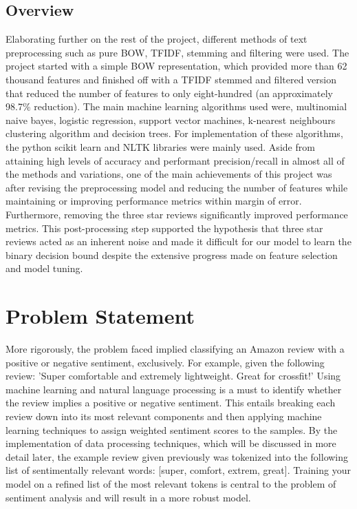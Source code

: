 \documentclass[conference]{IEEEtran}
\begin{document}
\subsection{Overview}
Elaborating further on the rest of the project, different methods of text preprocessing such as pure BOW, TFIDF, stemming and filtering were used. The project started with a simple BOW representation, which provided more than 62 thousand features and finished off with a TFIDF stemmed and filtered version that reduced the number of features to only eight-hundred (an approximately 98.7\% reduction). The main machine learning algorithms used were, multinomial naive bayes, logistic regression, support vector machines, k-nearest neighbours clustering algorithm and decision trees. For implementation of these algorithms, the python scikit learn and NLTK libraries were mainly used. Aside from attaining high levels of accuracy and performant precision/recall in almost all of the methods and variations, one of the main achievements of this project was after revising the preprocessing model and reducing the number of features while maintaining or improving performance metrics within margin of error. Furthermore, removing the three star reviews significantly improved performance metrics. This post-processing step supported the hypothesis that three star reviews acted as an inherent noise and made it difficult for our model to learn the binary decision bound despite the extensive progress made on feature selection and model tuning.


\section{Problem Statement}

	More rigorously, the problem faced implied classifying an Amazon review with a positive or negative sentiment, exclusively. For example, given the following review: 'Super comfortable and extremely lightweight. Great for crossfit!' Using machine learning and natural language processing is a must to identify whether the review implies a positive or negative sentiment. This entails breaking each review down into its most relevant components and then applying machine learning techniques to assign weighted sentiment scores to the samples. By the implementation of data processing techniques, which will be discussed in more detail later, the example review given previously was tokenized into the following list of sentimentally relevant words: [super, comfort, extrem, great]. Training your model on a refined list of the most relevant tokens is central to the problem of sentiment analysis and will result in a more robust model.
	
\end{document}
